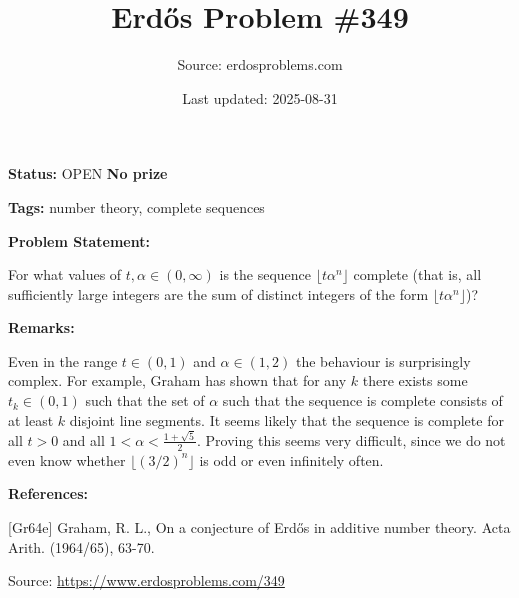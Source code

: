 \documentclass{article}
\title{Erd\H{o}s Problem \#349}
\date{Last updated: 2025-08-31}
\author{Source: erdosproblems.com}
\begin{document}
\maketitle

\noindent\textbf{Status:} OPEN \quad \textbf{No prize}

\noindent\textbf{Tags:} number theory, complete sequences

\medskip
\noindent\textbf{Problem Statement:}

For what values of $t,\alpha \in (0,\infty)$ is the sequence $\lfloor t\alpha^n\rfloor$ complete (that is, all sufficiently large integers are the sum of distinct integers of the form $\lfloor t\alpha^n\rfloor$)?

\bigskip
\noindent\textbf{Remarks:}

Even in the range $t\in (0,1)$ and $\alpha\in (1,2)$ the behaviour is surprisingly complex. For example, Graham \cite{Gr64e} has shown that for any $k$ there exists some $t_k\in (0,1)$ such that the set of $\alpha$ such that the sequence is complete consists of at least $k$ disjoint line segments. It seems likely that the sequence is complete for all $t>0$ and all $1<\alpha < \frac{1+\sqrt{5}}{2}$. Proving this seems very difficult, since we do not even know whether $\lfloor (3/2)^n\rfloor$ is odd or even infinitely often.

\bigskip
\noindent\textbf{References:}

[Gr64e] Graham, R. L., On a conjecture of Erd\H{o}s in additive number theory. Acta Arith. (1964/65), 63-70.

\bigskip
\noindent\small{Source: \url{https://www.erdosproblems.com/349}}
\end{document}
